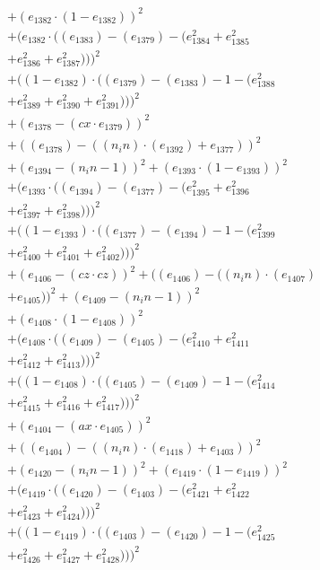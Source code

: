 \documentclass[10pt, a4paper]{article}
\begin{document}
\begin{small}
\begin{align*}
& + (e_{1382}  \cdot  (1 - e_{1382}))^{2} \\
& + (e_{1382}  \cdot  ((e_{1383}) - (e_{1379}) - (e_{1384}^{2} + e_{1385}^{2} \\
& + e_{1386}^{2} + e_{1387}^{2})))^{2} \\
& + ((1 - e_{1382})  \cdot  ((e_{1379}) - (e_{1383}) - 1 - (e_{1388}^{2} \\
& + e_{1389}^{2} + e_{1390}^{2} + e_{1391}^{2})))^{2} \\
& + (e_{1378} - (cx  \cdot  e_{1379}))^{2} \\
& + ((e_{1378}) - ((n_in)  \cdot  (e_{1392}) + e_{1377}))^{2} \\
& + (e_{1394} - (n_in - 1))^{2} + (e_{1393}  \cdot  (1 - e_{1393}))^{2} \\
& + (e_{1393}  \cdot  ((e_{1394}) - (e_{1377}) - (e_{1395}^{2} + e_{1396}^{2} \\
& + e_{1397}^{2} + e_{1398}^{2})))^{2} \\
& + ((1 - e_{1393})  \cdot  ((e_{1377}) - (e_{1394}) - 1 - (e_{1399}^{2} \\
& + e_{1400}^{2} + e_{1401}^{2} + e_{1402}^{2})))^{2} \\
& + (e_{1406} - (cz  \cdot  cz))^{2} + ((e_{1406}) - ((n_in)  \cdot  (e_{1407}) \\
& + e_{1405}))^{2} + (e_{1409} - (n_in - 1))^{2} \\
& + (e_{1408}  \cdot  (1 - e_{1408}))^{2} \\
& + (e_{1408}  \cdot  ((e_{1409}) - (e_{1405}) - (e_{1410}^{2} + e_{1411}^{2} \\
& + e_{1412}^{2} + e_{1413}^{2})))^{2} \\
& + ((1 - e_{1408})  \cdot  ((e_{1405}) - (e_{1409}) - 1 - (e_{1414}^{2} \\
& + e_{1415}^{2} + e_{1416}^{2} + e_{1417}^{2})))^{2} \\
& + (e_{1404} - (ax  \cdot  e_{1405}))^{2} \\
& + ((e_{1404}) - ((n_in)  \cdot  (e_{1418}) + e_{1403}))^{2} \\
& + (e_{1420} - (n_in - 1))^{2} + (e_{1419}  \cdot  (1 - e_{1419}))^{2} \\
& + (e_{1419}  \cdot  ((e_{1420}) - (e_{1403}) - (e_{1421}^{2} + e_{1422}^{2} \\
& + e_{1423}^{2} + e_{1424}^{2})))^{2} \\
& + ((1 - e_{1419})  \cdot  ((e_{1403}) - (e_{1420}) - 1 - (e_{1425}^{2} \\
& + e_{1426}^{2} + e_{1427}^{2} + e_{1428}^{2})))^{2} \\

\end{align*}
\end{small}
\end{document}
